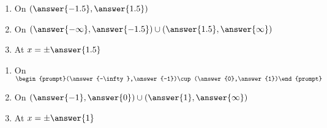 \documentclass{ximera}
\begin{document}
\begin{exercise}
\noindent\begin{minipage}[t]{.49\linewidth}
\begin{enumerate}
\item		On $(\answer{-1.5},\answer{1.5})$
\item		On $(\answer{-\infty},\answer{-1.5}) \cup (\answer{1.5},\answer{\infty})$
\item		At $x=\pm\answer{1.5}$
\end{enumerate}
\end{minipage}
\begin{minipage}[t]{.49\linewidth}
\begin{enumerate}\addtocounter{enumi}{3}
\item		On $\begin{prompt}(\answer{-\infty},\answer{-1})\cup(\answer{0},\answer{1})\end{prompt}$
\item		On $(\answer{-1},\answer{0})\cup(\answer{1},\answer{\infty})$
\item		At $x=\pm\answer{1}$
\end{enumerate}
\end{minipage}

\end{exercise}
\end{document}
